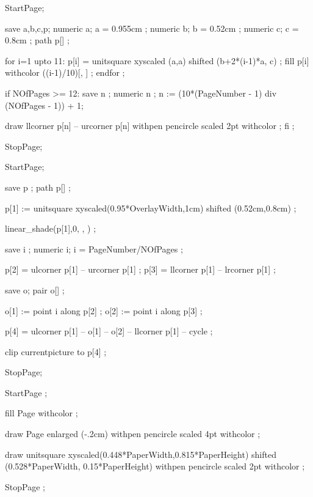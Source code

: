 StartPage;

save a,b,c,p;
numeric a; a = 0.955cm ;
numeric b; b = 0.52cm ;
numeric c; c = 0.8cm ;
path p[] ;

for i=1 upto 11:
	p[i] = unitsquare xyscaled (a,a) shifted (b+2*(i-1)*a, c) ;
    fill p[i] withcolor ((i-1)/10)[,
                                   ] ;
endfor ;

if NOfPages >= 12:
  save n ; numeric n ;
  n := (10*(PageNumber - 1) div (NOfPages - 1)) + 1;

  draw llcorner p[n] -- urcorner p[n] 
         withpen pencircle scaled 2pt 
         withcolor  ;
fi ;

StopPage;
\stopuseMPgraphic 

StartPage;

save p ;
path p[] ;

p[1] := unitsquare xyscaled(0.95*OverlayWidth,1cm) shifted (0.52cm,0.8cm) ;

linear_shade(p[1],0,
            ,
            ) ;

save i ;
numeric i; i = PageNumber/NOfPages ;

p[2] = ulcorner p[1] -- urcorner p[1] ;
p[3] = llcorner p[1] -- lrcorner p[1] ;

save o;
pair o[] ;

o[1] := point i along p[2] ;
o[2] := point i along p[3] ;

p[4] = ulcorner p[1] -- o[1] -- o[2] -- llcorner p[1] -- cycle ;

clip currentpicture to p[4] ;

StopPage;
\stopuseMPgraphic

StartPage ;

fill Page withcolor  ; 

draw Page enlarged (-.2cm) 
          withpen pencircle scaled 4pt 
          withcolor  ; 

draw unitsquare 
     xyscaled(0.448*PaperWidth,0.815*PaperHeight) 
     shifted (0.528*PaperWidth, 0.15*PaperHeight)
     withpen pencircle scaled 2pt 
     withcolor  ; 

StopPage ;
\stopuniqueMPgraphic 

